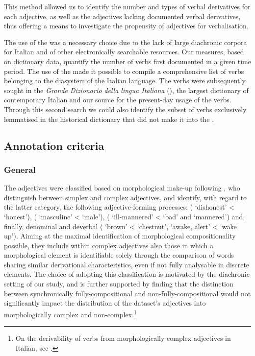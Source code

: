 \documentclass[output=paper,colorlinks,citecolor=brown]{langscibook}
\begin{document}
This method allowed us to identify the number and types of verbal derivatives for each adjective, as well as the adjectives lacking documented verbal derivatives, thus offering a means to investigate the propensity of adjectives for verbalisation.

The use of the  was a necessary choice due to the lack of large diachronic corpora for Italian and of other electronically searchable resources. Our  measures, based on dictionary data, quantify the number of verbs first documented in a given time period. The use of the  made it possible to compile a comprehensive list of verbs belonging to the diasystem of the Italian language. The verbs were subsequently sought in the \textit{Grande Dizionario della lingua Italiana} (), the largest dictionary of contemporary Italian and our source for the present-day usage of the verbs. Through this second search we could also identify the subset of verbs exclusively lemmatised in the historical dictionary that did not make it into the .

\subsection{Annotation criteria}
\label{sec:annotation}

\subsubsection{General}
The adjectives were classified based on morphological make-up following \citet{ThorntonEtAl1997}, who distinguish between simplex and complex adjectives, and identify, with regard to the latter category, the following adjective-forming processes:  ( ‘dishonest’ <  ‘honest’),  ( ‘masculine’ <  ‘male’),  ( ‘ill-mannered’ <  ‘bad’ and  ‘mannered’) and, finally, denominal  and deverbal   ( ‘brown’ <  ‘chestnut’,  ‘awake, alert’ <  ‘wake up’). Aiming at the maximal identification of morphological compositionality possible, they include within complex adjectives also those in which a morphological element is identifiable solely through the comparison of words sharing similar derivational characteristics, even if not fully analysable in discrete elements. The choice of adopting this classification is motivated by the diachronic setting of our study, and is further supported by finding that the distinction between synchronically fully-compositional and non-fully-compositional would not significantly impact the distribution of the dataset’s adjectives into morphologically complex and non-complex.\footnote{On the derivability of verbs from morphologically complex adjectives in Italian, see \citet{Grossmann1999}.}
\end{document}
